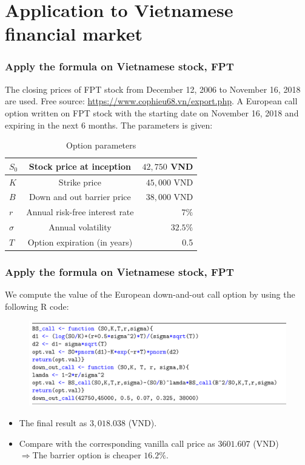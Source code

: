 \documentclass{beamer}
\begin{document}
\section{Application to Vietnamese financial market}
\begin{frame}
\frametitle{Apply the formula on Vietnamese stock, FPT}
The closing prices of FPT stock from December 12, 2006 to November 16, 2018 are used.\vspace{0.5cm} Free source:
\url{https://www.cophieu68.vn/export.php}.
A European call option written on FPT stock with the starting date on November 16, 2018 and expiring in the next 6 months. The parameters is given:  
\begin{table}[!htp]
	\centering
	\begin{tabular}{|l|c|r|}
		\hline
		$S_0$ & Stock price at inception   & $42,750$ VND\\
		\hline
		$K$ & Strike price  & $45,000$ VND\\
		\hline
		$B$ & Down and out barrier price & $38,000$ VND\\
		\hline
		$r$ & Annual risk-free interest rate  & $7\%$ \\
		\hline
		$\sigma$ & Annual volatility  & $32.5\%$ \\
		\hline
		$T$ & Option expiration (in years)  & 0.5\\
		\hline	
	\end{tabular}
	\caption{Option parameters}
	\label{B4.1}
\end{table} 
\end{frame}
\begin{frame}
\frametitle{Apply the formula on Vietnamese stock, FPT}
 We compute the value of the European down-and-out call option by using the following R code:
\begin{figure}[htp]
	\begin{center}
		\includegraphics[scale=0.5]{Rcode}
    \end{center}
\end{figure}
\begin{itemize}
\item The final result as $3,018.038$ (VND). \\
\item Compare with the corresponding vanilla call price as $3601.607$ (VND)\\
$\Rightarrow$The barrier option is cheaper $16.2\%$.
\end{itemize}
\end{frame}
\end{document}
